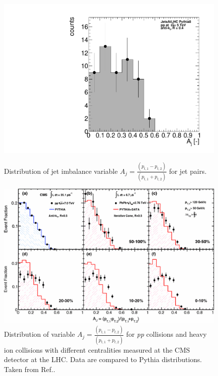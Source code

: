 \documentclass[a4paper,10pt]{article}
\begin{document}
\begin{figure}[htbp]
    \centering
    \begin{minipage}{0.38\textwidth}
        \centering
        \includegraphics[width=\textwidth]{figures/hJetImbalance.pdf}
        \caption{Distribution of jet imbalance variable $A_j= \frac{(p_{t,1} - p_{t,2})}{(p_{t,1} + p_{t,2})}$ for jet pairs. }
        \label{f10}
    \end{minipage}\hfill
    \begin{minipage}{0.58\textwidth}
        \centering
        \includegraphics[width=\textwidth]{figures/pTimbalance.png}
        \caption{Distribution of variable $A_j= \frac{(p_{t,1} - p_{t,2})}{(p_{t,1} + p_{t,2})}$ for \textit{pp} collisions and heavy ion collisions with different centralities measured at the CMS detector at the LHC. Data are compared to Pythia distributions. Taken from Ref.\cite{CMS}. }
        \label{f11}
    \end{minipage}
\end{figure}
\end{document}
